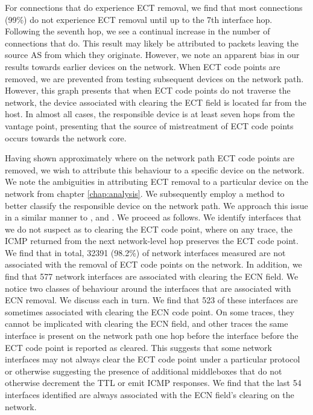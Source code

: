 \documentclass{l4proj}
\begin{document}
For connections that do experience ECT removal, we find that most connections (99\%) do not experience ECT removal until up to the 7th interface hop. Following the seventh hop, we see a continual increase in the number of connections that do. This result may likely be attributed to packets leaving the source AS from which they originate. However, we note an apparent bias in our results towards earlier devices on the network. When ECT code points are removed, we are prevented from testing subsequent devices on the network path. However, this graph presents that when ECT code points do not traverse the network, the device associated with clearing the ECT field is located far from the host. In almost all cases, the responsible device is at least seven hops from the vantage point, presenting that the source of mistreatment of ECT code points occurs towards the network core.

Having shown approximately where on the network path ECT code points are removed, we wish to attribute this behaviour to a specific device on the network. We note the ambiguities in attributing ECT removal to a particular device on the network from chapter \ref{chap:analysis}. We subsequently employ a method to better classify the responsible device on the network path. We approach this issue in a similar manner to \cite{mcquistin_is_2015}, and \cite{bauer_measuring_2011}. We proceed as follows. We identify interfaces that we do not suspect as to clearing the ECT code point, where on any trace, the ICMP returned from the next network-level hop preserves the ECT code point. We find that in total, 32391 (98.2\%) of network interfaces measured are not associated with the removal of ECT code points on the network. In addition, we find that 577 network interfaces are associated with clearing the ECN field. We notice two classes of behaviour around the interfaces that are associated with ECN removal. We discuss each in turn. We find that 523 of these interfaces are sometimes associated with clearing the ECN code point. On some traces, they cannot be implicated with clearing the ECN field, and other traces the same interface is present on the network path one hop before the interface before the ECT code point is reported as cleared. This suggests that some network interfaces may not always clear the ECT code point under a particular protocol or otherwise suggesting the presence of additional middleboxes that do not otherwise decrement the TTL or emit ICMP responses. We find that the last 54 interfaces identified are always associated with the ECN field's clearing on the network.
\end{document}
